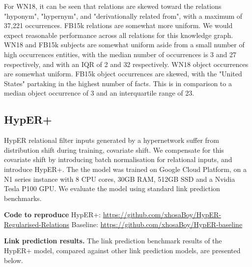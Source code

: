 \noindent For WN18, it can be seen that relations are skewed toward the relations "hyponym",  "hypernym", and "derivationally related from", with a maximum of 37,221 occurrences. FB15k relations are somewhat more uniform. We would expect reasonable performance across all relations for this knowledge graph. WN18 and FB15k subjects are somewhat uniform aside from a small number of high occurrences entities, with the median number of occurrences is 3 and 27 respectively, and with an IQR of 2 and 32 respectively. WN18 object occurrences are somewhat uniform. FB15k object occurrences are skewed, with the "United States" partaking in the highest number of facts. This is in comparison to a median object occurrence of 3 and an interquartile range of 23.



\subsection{HypER+}
HypER relational filter inputs generated by a hypernetwork suffer from distribution shift during training, covariate shift. We compensate for this covariate shift by introducing batch normalisation for relational inputs, and introduce HypER+. The the model was trained on Google Cloud Platform, on a N1 series instance with  8 CPU cores, 30GB RAM, 512GB SSD and a Nvidia Tesla P100 GPU. We evaluate the model using standard link prediction benchmarks. \par

\noindent \textbf{Code to reproduce} \newline
HypER+: \url{https://github.com/xhosaBoy/HypER-Regularised-Relations} \newline
Baseline: \url{https://github.com/xhosaBoy/HypER-baseline}

\noindent \textbf{Link prediction results.} The link prediction benchmark results of the HypER+ model, compared against other link prediction models, are presented below.


\bigskip

